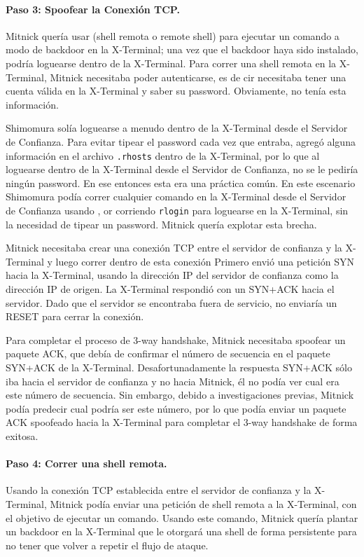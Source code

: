\paragraph{Paso 3: Spoofear la Conexión TCP.}
Mitnick quería usar \rsh (shell remota o remote shell) para ejecutar un comando a modo de backdoor en la X-Terminal; una vez que el backdoor haya sido instalado, podría loguearse dentro de la X-Terminal.
Para correr una shell remota en la X-Terminal, Mitnick necesitaba poder autenticarse, es de cir necesitaba tener una cuenta válida en la X-Terminal y saber su password. Obviamente, no tenía esta información.

Shimomura solía loguearse a menudo dentro de la X-Terminal desde el Servidor de Confianza. Para evitar tipear el password cada vez que entraba, agregó alguna información en el archivo \texttt{.rhosts}  dentro de la X-Terminal, por lo que al loguearse dentro de la X-Terminal desde el Servidor de Confianza, no se le pediría ningún password. En ese entonces esta era una práctica común. En este escenario Shimomura podía correr cualquier comando en la X-Terminal desde el Servidor de Confianza usando \rsh, or corriendo \texttt{rlogin} para loguearse en la X-Terminal, sin la necesidad de tipear un password.
Mitnick quería explotar esta brecha.

Mitnick necesitaba crear una conexión TCP entre el servidor de confianza y la X-Terminal y luego correr  \rsh dentro de esta conexión
Primero envió una petición SYN hacia la X-Terminal, usando la dirección IP del servidor de confianza como la dirección IP de origen.
La X-Terminal respondió con un SYN+ACK hacia el servidor. Dado que el servidor se encontraba fuera de servicio, no enviaría un RESET para cerrar la conexión. 

Para completar el proceso de 3-way handshake, Mitnick necesitaba spoofear un paquete ACK, que debía de confirmar el número de secuencia en el paquete SYN+ACK de la X-Terminal. Desafortunadamente la respuesta SYN+ACK sólo iba hacia el servidor de confianza y no hacia Mitnick, él no podía ver cual era este número de secuencia. Sin embargo, debido a investigaciones previas, Mitnick podía predecir cual podría ser este número, por lo que podía enviar un paquete ACK spoofeado hacia la X-Terminal para completar el 3-way handshake de forma exitosa.


\paragraph{Paso 4: Correr una shell remota.} 
Usando la conexión TCP establecida entre el servidor de confianza y la X-Terminal, Mitnick podía enviar una petición de shell remota a la X-Terminal, con el objetivo de ejecutar un comando. Usando este comando, Mitnick quería plantar un backdoor en la X-Terminal que le otorgará una shell de forma persistente para no tener que volver a repetir el flujo de ataque.

